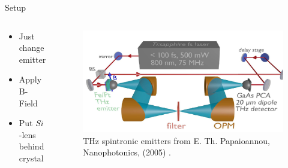 \documentclass[aspectratio=1610, 9pt]{beamer}
\begin{document}
\begin{frame}{Setup}
  \begin{center}
    \begin{columns}
      \begin{column}{0.3\textwidth}
        \begin{itemize}
          \item Just change emitter
          \vspace{0.3in}
          \item Apply B-Field
          \vspace{0.3in}
          \item Put $Si$-lens behind crystal
        \end{itemize}
      \end{column}
      \begin{column}{.6\textwidth}
        \begin{center}
          \begin{figure}
          \includegraphics[width=\textwidth]{pics/setup.png}
          \caption{\textcolor{tugreen}{THz spintronic emitters} from E. Th. Papaioannou, Nanophotonics, (2005) .}
          \end{figure}
        \end{center}
      \end{column}
    \end{columns}
  \end{center}
\end{frame}
\end{document}
